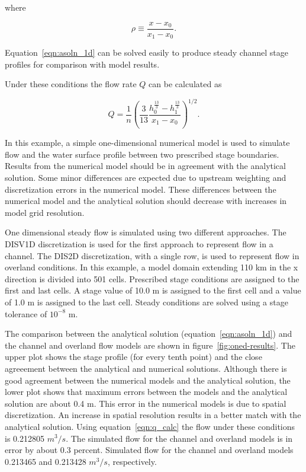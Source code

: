 \documentclass[fleqn]{article}
\begin{document}
\noindent where

\begin{equation}
  \rho \equiv \frac{x - x_0}{x_1 - x_0} .
  \label{eqn:rho_defined_x}
\end{equation}

\noindent Equation~\ref{eqn:asoln_1d} can be solved easily to produce steady channel stage profiles for comparison with model results.

Under these conditions the flow rate $Q$ can be calculated as

\begin{equation}
  Q = \frac{1}{n} \left ( 
    \frac{3}{13}
    \frac{h^{\frac{13}{3}}_{0} - h^{\frac{13}{3}}_{1}}{x_1 - x_0}
  \right )^{1/2}.
  \label{eqn:q_calc}
\end{equation}


In this example, a simple one-dimensional numerical model is used to simulate flow and the water surface profile between two prescribed stage boundaries.  Results from the numerical model should be in agreement with the analytical solution.  Some minor differences are expected due to upstream weighting and discretization errors in the numerical model.  These differences between the numerical model and the analytical solution should decrease with increases in model grid resolution.

One dimensional steady flow is simulated using two different approaches.  The DISV1D discretization is used for the first approach to represent flow in a channel.  The DIS2D discretization, with a single row, is used to represent flow in overland conditions.  In this example, a model domain extending 110 km in the x direction is divided into 501 cells.  Prescribed stage conditions are assigned to the first and last cells.  A stage value of 10.0 m is assigned to the first cell and a value of 1.0 m is assigned to the last cell.  Steady conditions are solved using a stage tolerance of $10^{-8}$ m.

The comparison between the analytical solution (equation~\ref{eqn:asoln_1d}) and the channel and overland flow models are shown in figure~\ref{fig:oned-results}.  The upper plot shows the stage profile (for every tenth point) and the close agreeement between the analytical and numerical solutions.  Although there is good agreement between the numerical models and the analytical solution, the lower plot shows that maximum errors between the models and the analytical solution are about 0.4 m.  This error in the numerical models is due to spatial discretization.  An increase in spatial resolution results in a better match with the analytical solution.  Using equation~\ref{eqn:q_calc} the flow under these conditions is 0.212805 $m^3/s$.  The simulated flow for the channel and overland models is in error by about 0.3 percent. Simulated flow for the channel and overland models 0.213465 and 0.213428 $m^3/s$, respectively.  
\end{document}
